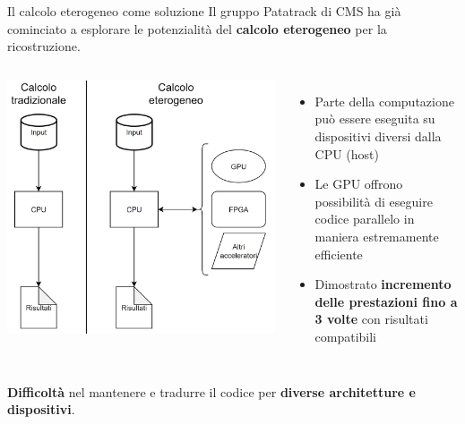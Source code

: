\documentclass{beamer}
\begin{document}
\begin{frame}{Il calcolo eterogeneo come soluzione}
Il gruppo Patatrack di CMS ha già cominciato a esplorare le potenzialità del \textbf{calcolo eterogeneo} per la ricostruzione.
\vspace{3mm}
\begin{columns}
\centering
\includegraphics[width=\textwidth]{media/calcolo_eterogeneo.png}
\begin{itemize}
    \item Parte della computazione può essere eseguita su dispositivi diversi dalla CPU (host)
    \item Le GPU offrono possibilità di eseguire codice parallelo in maniera estremamente efficiente
    \item Dimostrato \textbf{incremento delle prestazioni fino a 3 volte} con risultati compatibili
    \end{itemize}
\end{columns}
\vspace{3mm}
\textbf{Difficoltà} nel mantenere e tradurre il codice per \textbf{diverse architetture e dispositivi}.
\end{frame}
\end{document}
